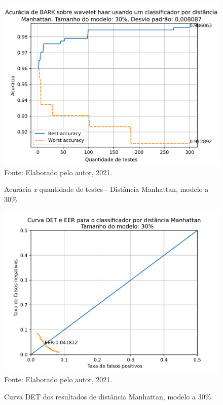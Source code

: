			\begin{figure}[H]
				\centering
				\caption{Acurácia \textit{x} quantidade de testes - Distância Manhattan, modelo a 30\%}
				\includegraphics[width=.9\linewidth]{images/results/confusionMatrices/classifier_Manhattan_30}
				\label{fig:classifiermanhattan30}
				\\Fonte: Elaborado pelo autor, 2021.
			\end{figure}
		
			\begin{figure}[H]
				\centering
				\caption{Curva DET dos resultados de distância Manhattan, modelo a 30\%}
				\includegraphics[width=.9\linewidth]{images/results/det/DET_for_classifier_Manhattan_30}
				\label{fig:detforclassifiermanhattan30}
				\\Fonte: Elaborado pelo autor, 2021.
			\end{figure}

